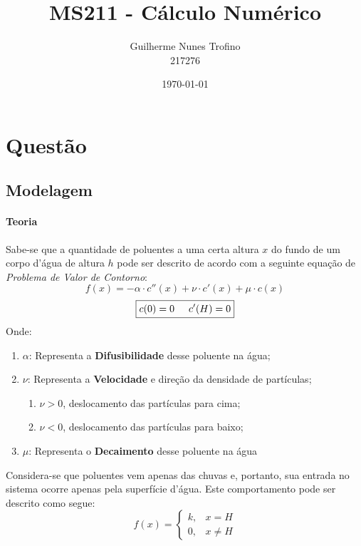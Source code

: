 \documentclass{article}
\title{MS211 - Cálculo Numérico}
\author{Guilherme Nunes Trofino\\217276}
\date{\today}
\begin{document}
    \maketitle
\newpage

\section{Questão}
    \subsection{Modelagem}
        \paragraph{Teoria}Sabe-se que a quantidade de poluentes a uma certa altura $x$ do fundo de um corpo d'água de altura $h$ pode ser descrito de acordo com a seguinte equação de \textit{Problema de Valor de Contorno}:
            \begin{equation}
                \boxed{f(x) = - \alpha\cdot c''(x) + \nu\cdot c'(x) + \mu\cdot c(x)}\label{eq:1}
            \end{equation}
            \begin{equation}
                \boxed{c(0) = 0 \hspace{5mm} c'(H) = 0}\label{eq:2}
            \end{equation}
        Onde:
            \begin{enumerate}[noitemsep]
                \item $\alpha$: Representa a \textbf{Difusibilidade} desse poluente na água;
                \item $\nu$: Representa a \textbf{Velocidade} e direção da densidade de partículas;
                    \begin{enumerate}[noitemsep]
                        \item $\nu > 0$, deslocamento das partículas para cima;
                        \item $\nu < 0$, deslocamento das partículas para baixo;
                    \end{enumerate}
                        \item $\mu$: Representa o \textbf{Decaimento} desse poluente na água
            \end{enumerate}
        Considera-se que poluentes vem apenas das chuvas e, portanto, sua entrada no sistema ocorre apenas pela superfície d'água. Este comportamento pode ser descrito como segue:
            \begin{equation}
                \boxed{
                    f(x) = \begin{cases}
                        k, & x = H\\
                        0, & x \neq H
                    \end{cases}\label{eq:3}
                }
            \end{equation}
\end{document}
